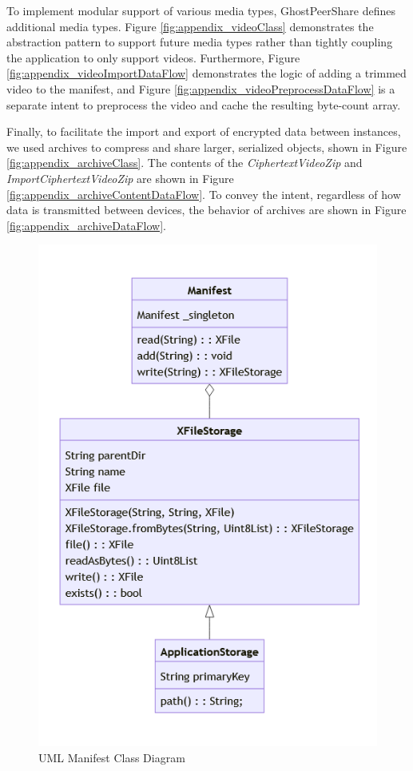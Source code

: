 \documentclass [11pt, proquest] {uwthesis}[2020/02/24]
\begin{document}
To implement modular support of various media types, GhostPeerShare defines additional media types. Figure \ref{fig:appendix_videoClass} demonstrates the abstraction pattern to support future media types rather than tightly coupling the application to only support videos. Furthermore, Figure \ref{fig:appendix_videoImportDataFlow} demonstrates the logic of adding a trimmed video to the manifest, and Figure \ref{fig:appendix_videoPreprocessDataFlow} is a separate intent to preprocess the video and cache the resulting byte-count array.

Finally, to facilitate the import and export of encrypted data between instances, we used archives to compress and share larger, serialized objects, shown in Figure \ref{fig:appendix_archiveClass}. The contents of the \textit{CiphertextVideoZip} and \textit{ImportCiphertextVideoZip} are shown in Figure \ref{fig:appendix_archiveContentDataFlow}. To convey the intent, regardless of how data is transmitted between devices, the behavior of archives are shown in Figure \ref{fig:appendix_archiveDataFlow}.

\begin{figure}
  \centering
  \includegraphics[width=\textwidth,height=0.8\textheight,keepaspectratio]{Appendix/Figures/manifestClass.png}
  \caption{UML Manifest Class Diagram}
  \label{fig:appendix_manifestClass}
\end{figure}
\end{document}
